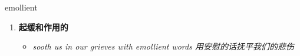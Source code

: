 
\begin{frame}
{\huge emollient}
\begin{center}
\begin{enumerate}\Large
  \item \textbf{起缓和作用的}
  \begin{itemize}
    \item \em{\Large{sooth us in our grieves with emollient words 用安慰的话抚平我们的悲伤}}
  \end{itemize}
\end{enumerate}
\end{center}
\end{frame}

